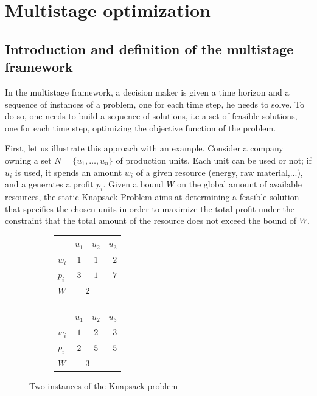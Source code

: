 \documentclass[a4paper]{book}
\begin{document}
\section{Multistage optimization}
\subsection{Introduction and definition of the multistage framework}\label{multiintro}

In the multistage framework, a decision maker is given a time horizon and a sequence of instances of a problem, one for each time step, he needs to solve. To do so, one needs to build a sequence of solutions, i.e a set of feasible solutions, one for each time step, optimizing the objective function of the problem. 

First, let us illustrate this approach with an example. Consider a company owning a set $N=\{u_1,\ldots,u_n\}$ of production units. Each unit can be used or not; if $u_i$ is used, it spends an amount $w_i$ of a given resource (energy, raw material,...), and a generates a profit $p_i$. Given a bound $W$ on the global amount of available resources, the static {\sc Knapsack Problem} aims at determining a feasible solution that specifies the chosen units in order to maximize the total profit under the constraint that the total amount of the resource does not exceed the bound of $W$.

\begin{figure}[h]
\centering
\begin{subfigure}[b]{0.4\textwidth}
\begin{tabular}{|l|c|c|r|}
  \hline
   &$u_1$&$u_2$&$u_3$ \\
  \hline
 $w_{i}$ & $1$ & $1$ & $2$\\
    \hline
  $p_{i} $& $3$ & $1$ & $7$\\
  \hline
  $W$ & \multicolumn{2}{c}{\text{   }2} &\\
  \hline
\end{tabular}
\end{subfigure}
\begin{subfigure}[b]{0.4\textwidth}
\begin{tabular}{|l|c|c|r|}
  \hline
   &$u_1$&$u_2$&$u_3$ \\
  \hline
 $w_{i}$ & $1$ & $2$ & $3$\\
    \hline
  $p_{i} $& $2$ & $5$ & $5$\\
  \hline
   $W$ & \multicolumn{2}{c}{\text{     }3} &\\
  \hline
\end{tabular}
\end{subfigure}
\caption{Two instances of the {\sc Knapsack} problem}
\label{statickp}
\end{figure}
\end{document}
